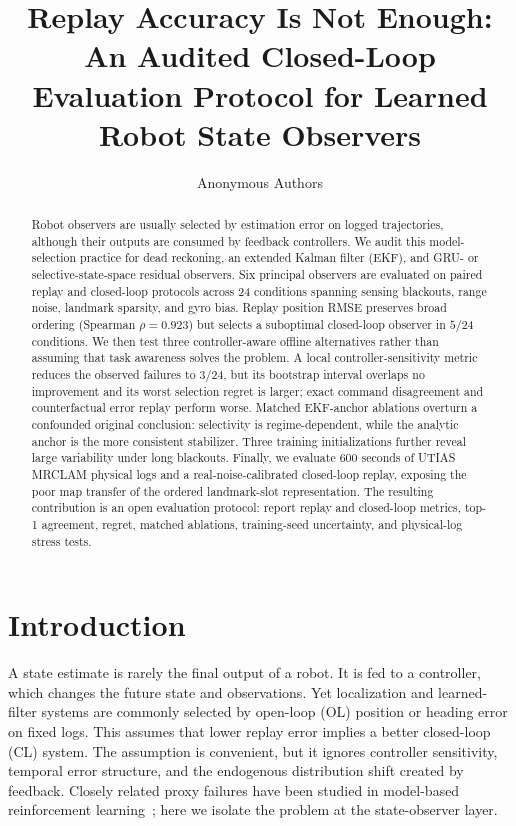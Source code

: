 \documentclass{article}
\title{Replay Accuracy Is Not Enough:\\
An Audited Closed-Loop Evaluation Protocol for Learned Robot State Observers}
\author{Anonymous Authors}
\begin{document}
\maketitle

\begin{abstract}
Robot observers are usually selected by estimation error on logged trajectories, although their outputs are consumed by feedback controllers. We audit this model-selection practice for dead reckoning, an extended Kalman filter (EKF), and GRU- or selective-state-space residual observers. Six principal observers are evaluated on paired replay and closed-loop protocols across 24 conditions spanning sensing blackouts, range noise, landmark sparsity, and gyro bias. Replay position RMSE preserves broad ordering (Spearman $\rho=0.923$) but selects a suboptimal closed-loop observer in $5/24$ conditions. We then test three controller-aware offline alternatives rather than assuming that task awareness solves the problem. A local controller-sensitivity metric reduces the observed failures to $3/24$, but its bootstrap interval overlaps no improvement and its worst selection regret is larger; exact command disagreement and counterfactual error replay perform worse. Matched EKF-anchor ablations overturn a confounded original conclusion: selectivity is regime-dependent, while the analytic anchor is the more consistent stabilizer. Three training initializations further reveal large variability under long blackouts. Finally, we evaluate 600 seconds of UTIAS MRCLAM physical logs and a real-noise-calibrated closed-loop replay, exposing the poor map transfer of the ordered landmark-slot representation. The resulting contribution is an open evaluation protocol: report replay and closed-loop metrics, top-1 agreement, regret, matched ablations, training-seed uncertainty, and physical-log stress tests.
\end{abstract}

\section{Introduction}
A state estimate is rarely the final output of a robot. It is fed to a controller, which changes the future state and observations. Yet localization and learned-filter systems are commonly selected by open-loop (OL) position or heading error on fixed logs. This assumes that lower replay error implies a better closed-loop (CL) system. The assumption is convenient, but it ignores controller sensitivity, temporal error structure, and the endogenous distribution shift created by feedback. Closely related proxy failures have been studied in model-based reinforcement learning~\citep{lambert2020objective}; here we isolate the problem at the state-observer layer.
\end{document}
